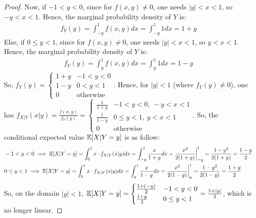 \documentclass{article}
\begin{document}
\begin{proof}
    Now, if $-1<y< 0$, since for $f(x,y)\neq 0$, one needs $|y|<x<1$, so $-y<x<1$. Hence, the marginal probability density of $Y$ is:
    \begin{align}
        f_Y(y)=\int_{-y}^{1}f(x,y)dx = \int_{-y}^{1}1dx = 1+y
    \end{align}
    Else, if $0\leq y<1$, since for $f(x,y)\neq 0$, one needs $|y|<x<1$, so $y<x<1$. Hence, the marginal probability density of $Y$ is:
    \begin{align}
        f_Y(y) = \int_{y}^{1}f(x,y)dx = \int_{y}^{1}1 dx = 1-y
    \end{align}
    So, $f_Y(y) = \begin{cases}
        1+y & -1<y<0\\
        1-y & 0<y<1\\
        0 & \text{otherwise}
    \end{cases}$. Hence, for $|y|<1$ (where $f_Y(y)\neq 0$), one has $f_{X|Y}(x|y) = \frac{f(x,y)}{f_Y(y)} = \begin{cases}
        \frac{1}{1+y} & -1<y<0,\ -y<x<1\\
        \frac{1}{1-y} & 0\leq y<1,\ y<x<1\\
        0 & \text{otherwise}
    \end{cases}$. So, the conditional expected value $\mathbb{E}[X|Y=y]$ is as follow:
    \begin{align}
        &-1<y<0\implies \mathbb{E}[X|Y=y] = \int_{0}^{1}x \cdot f_{X|Y}(x|y)dx = \int_{-y}^{1}\frac{x}{1+y}dx = \frac{x^2}{2(1+y)}\bigg|_{-y}^{1} = \frac{1-y^2}{2(1+y)} = \frac{1-y}{2}\\
        &0\leq y<1\implies \mathbb{E}[X|Y=y] = \int_{0}^{1}x\cdot f_{X|Y}(x|y)dx = \int_{y}^{1}\frac{x}{1-y}dx= \frac{x^2}{2(1-y)}\bigg|_{y}^{1} = \frac{1-y^2}{2(1-y)} = \frac{1+y}{2}
    \end{align}
    So, on the domain $|y|<1$, $\mathbb{E}[X|Y=y] = \begin{cases}
        \frac{1+(-y)}{2} & -1<y<0\\
        \frac{1+y}{2} & 0\leq y<1
    \end{cases} = \frac{1+|y|}{2}$, which is no longer linear.
\end{proof}

\newpage
\end{document}
